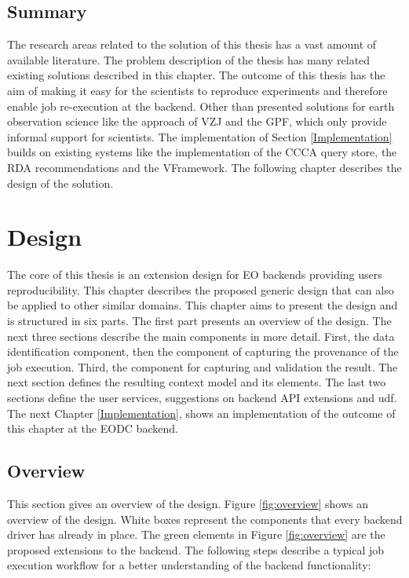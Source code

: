 \documentclass[draft,final]{vutinfth} %
\begin{document}
\section{Summary}

The research areas related to the solution of this thesis has a vast amount of available literature. The problem description of the thesis has many related existing solutions described in this chapter. The outcome of this thesis has the aim of making it easy for the scientists to reproduce experiments and therefore enable job re-execution at the backend. Other than presented solutions for earth observation science like the approach of VZJ and the GPF, which only provide informal support for scientists. The implementation of Section \ref{Implementation} builds on existing systems like the implementation of the CCCA query store, the RDA recommendations and the VFramework. The following chapter describes the design of the solution. 
 
\chapter{Design}\label{Design}


The core of this thesis is an extension design for EO backends providing users reproducibility. This chapter describes the proposed generic design that can also be applied to other similar domains. This chapter aims to present the design and is structured in six parts. The first part presents an overview of the design. The next three sections describe the main components in more detail. First,  the data identification component, then the component of capturing the provenance of the job execution. Third, the component for capturing and validation the result. The next section defines the resulting context model and its elements. The last two sections define the user services, suggestions on backend API extensions and \gls{udf}. The next Chapter \ref{Implementation}, shows an implementation of the outcome of this chapter at the EODC backend. 

\section{Overview}\label{Design:Overview}
This section gives an overview of the design. Figure \ref{fig:overview} shows an overview of the design. White boxes represent the components that every backend driver has already in place. The green elements in Figure \ref{fig:overview} are the proposed extensions to the backend. The following steps describe a typical job execution workflow for a better understanding of the backend functionality:
\end{document}
